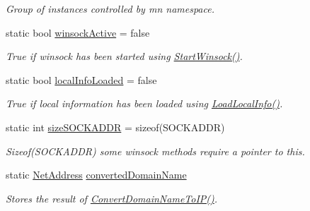 \begin{DoxyCompactItemize}
\begin{DoxyCompactList}\small\item\em Group of instances controlled by mn namespace. \item\end{DoxyCompactList}\item 
\hypertarget{class_net_utility_afb399170853b04afd3f71af66576cdd8}{
static bool \hyperlink{class_net_utility_afb399170853b04afd3f71af66576cdd8}{winsockActive} = false}
\label{class_net_utility_afb399170853b04afd3f71af66576cdd8}

\begin{DoxyCompactList}\small\item\em True if winsock has been started using \hyperlink{class_net_utility_a02950745d0116653291f28817b896386}{StartWinsock()}. \item\end{DoxyCompactList}\item 
\hypertarget{class_net_utility_a4a6ccbc32959a956ec43d9c4373821b0}{
static bool \hyperlink{class_net_utility_a4a6ccbc32959a956ec43d9c4373821b0}{localInfoLoaded} = false}
\label{class_net_utility_a4a6ccbc32959a956ec43d9c4373821b0}

\begin{DoxyCompactList}\small\item\em True if local information has been loaded using \hyperlink{class_net_utility_a4a35e8694ff38e90f3b84c81ac108300}{LoadLocalInfo()}. \item\end{DoxyCompactList}\item 
\hypertarget{class_net_utility_af693d73cef8fcec47e86e570431b3696}{
static int \hyperlink{class_net_utility_af693d73cef8fcec47e86e570431b3696}{sizeSOCKADDR} = sizeof(SOCKADDR)}
\label{class_net_utility_af693d73cef8fcec47e86e570431b3696}

\begin{DoxyCompactList}\small\item\em Sizeof(SOCKADDR) some winsock methods require a pointer to this. \item\end{DoxyCompactList}\item 
\hypertarget{class_net_utility_acf4e92ce27684eabb52d3258e654b853}{
static \hyperlink{class_net_address}{NetAddress} \hyperlink{class_net_utility_acf4e92ce27684eabb52d3258e654b853}{convertedDomainName}}
\label{class_net_utility_acf4e92ce27684eabb52d3258e654b853}

\begin{DoxyCompactList}\small\item\em Stores the result of \hyperlink{class_net_utility_a9a0239fd2f2e3f92f3fd68049c61d82f}{ConvertDomainNameToIP()}. \item\end{DoxyCompactList}\end{DoxyCompactItemize}


